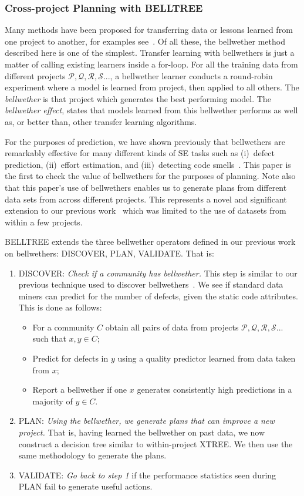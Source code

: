 \documentclass[10pt, journal, compsoc]{IEEEtran}
\newcommand{\bi}{\begin{itemize}} %
\newcommand{\ei}{\end{itemize}}
\newcommand{\be}{\begin{enumerate}}
\newcommand{\ee}{\end{enumerate}}
\begin{document}
\subsubsection{Cross-project Planning with BELLTREE}
\label{sect:CPXTREE}

Many methods have been proposed for transferring data or lessons
learned from one project to another, for examples see~\cite{Nam2013, Nam2015, jing15, kocaguneli2011find, kocaguneli2012, turhan09, peters15}. Of all these, the bellwether method described here is one of the simplest.
Transfer learning with bellwethers is just a matter of calling existing
learners inside a for-loop. For all the training data from different projects $\mathcal{P, Q, R, S...}$, 
a bellwether learner conducts a round-robin experiment where a model is learned from project, then applied to all others. The {\em bellwether} is that project which generates the best performing model. The {\em bellwether effect}, states that models
learned from this bellwether performs as well as, or better than, other transfer learning algorithms. 

For the purposes of prediction, we have shown previously that bellwethers are remarkably
effective for many different kinds of SE tasks such as (i)~defect prediction, (ii)~effort
estimation, and (iii)~detecting code smells~\cite{krishna17b}. This paper is the first to check the value of bellwethers for the purposes of planning. Note also that this paper's use of bellwethers enables us to generate plans from different data sets from across different projects. This represents a novel and significant extension to our previous work~\cite{krishna17a} which was limited to the use of datasets from within a few projects.



BELLTREE extends the three bellwether operators defined in our previous work~\cite{krishna17b} on bellwethers: DISCOVER, PLAN, VALIDATE. That is:~ 
\be
  \item DISCOVER: {\em Check if a community has bellwether.} 
  This step is similar to our previous technique used to discover bellwethers~\cite{krishna16}. We see if standard data miners can predict for the number of defects, given the static code attributes. This is done as follows:~ 
  \bi 
  \item
  For a community $C$ obtain all pairs of data from
  projects $\mathcal{P, Q, R, S...}$ such that $x, y \in C$;
  \item
  Predict for defects in $y$ using a quality predictor learned from data taken from $x$;
  \item
  Report a bellwether if one $x$ generates consistently high predictions in a majority of $y \in C$.
  \ei
  \item PLAN: {\em Using the bellwether, we generate plans that can improve a new project.} That is, 
  having learned the bellwether on past data, we now construct a decision tree similar to within-project XTREE. We then use the same methodology to generate the plans.
  \item VALIDATE: {\em Go back to step 1} if the performance statistics seen during PLAN fail to generate useful actions.
  \ee
  
\end{document}
